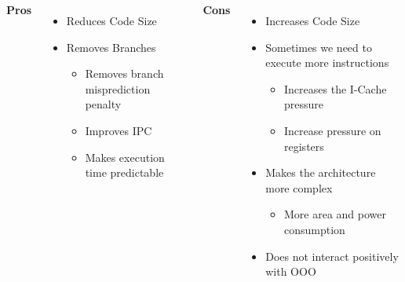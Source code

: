     \begin{columns}[t] %
            \textbf{Pros}
            \begin{itemize}
                \item Reduces Code Size
                \item Removes Branches
                \begin{itemize}
                    \item Removes branch misprediction penalty
                    \item Improves IPC
                    \item Makes execution time predictable
                \end{itemize}
            \end{itemize}

            \textbf{Cons}
            \begin{itemize}
                \item Increases Code Size
                \item Sometimes we need to execute more instructions
                \begin{itemize}
                    \item Increases the I-Cache pressure
                    \item Increase pressure on registers
                \end{itemize}
                \item Makes the architecture more complex
                \begin{itemize}
                    \item More area and power consumption
                \end{itemize}
                \item Does not interact positively with OOO
                
                
            \end{itemize}
    \end{columns}
    